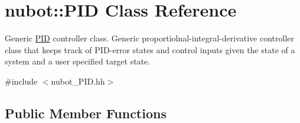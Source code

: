 \hypertarget{classnubot_1_1PID}{\section{nubot\-:\-:P\-I\-D Class Reference}
\label{classnubot_1_1PID}
}


Generic \hyperlink{classnubot_1_1PID}{P\-I\-D} controller class. Generic proportiolnal-\/integral-\/derivative controller class that keeps track of P\-I\-D-\/error states and control inputs given the state of a system and a user specified target state.  




{\ttfamily \#include $<$nubot\-\_\-\-P\-I\-D.\-hh$>$}

\subsection*{Public Member Functions}
